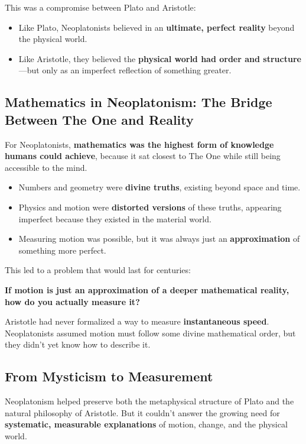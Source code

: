 This was a compromise between Plato and Aristotle:

\begin{itemize}
    \item Like Plato, Neoplatonists believed in an \textbf{ultimate, perfect reality} beyond the physical world.
    \item Like Aristotle, they believed the \textbf{physical world had order and structure}—but only as an imperfect reflection of something greater.
\end{itemize}

\subsection{Mathematics in Neoplatonism: The Bridge Between The One and Reality}

For Neoplatonists, \textbf{mathematics was the highest form of knowledge humans could achieve}, because it sat closest to The One while still being accessible to the mind.

\begin{itemize}
    \item Numbers and geometry were \textbf{divine truths}, existing beyond space and time.
    \item Physics and motion were \textbf{distorted versions} of these truths, appearing imperfect because they existed in the material world.
    \item Measuring motion was possible, but it was always just an \textbf{approximation} of something more perfect.
\end{itemize}

This led to a problem that would last for centuries:

\textbf{If motion is just an approximation of a deeper mathematical reality, how do you actually measure it?}

Aristotle had never formalized a way to measure \textbf{instantaneous speed}. Neoplatonists assumed motion must follow some divine mathematical order, but they didn’t yet know how to describe it.

\subsection{From Mysticism to Measurement}

Neoplatonism helped preserve both the metaphysical structure of Plato and the natural philosophy of Aristotle. But it couldn’t answer the growing need for \textbf{systematic, measurable explanations} of motion, change, and the physical world.

